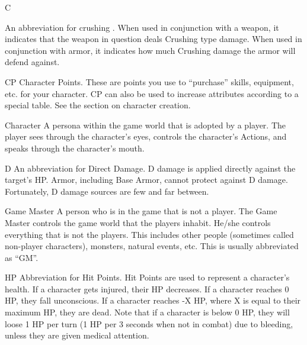 \documentclass[twoside]{book}
\begin{document}
              
              
              
                 C 
                
                An abbreviation for 
                  crushing  . When used in conjunction
                  with a weapon, it indicates that the weapon in question
                  deals Crushing type damage. When used in conjunction
                  with armor, it indicates how much Crushing damage the
                  armor will defend against.
                
              
              
               CP   
                  Character Points. These are points you use to
                 “purchase” skills, equipment, etc. for your
                 character. CP can also be used to increase attributes
                 according to a special table. See the section on
                 character creation. 
              
              
               Character   
                  A persona within the game world that is adopted
                 by a player. The player sees through the
                 character’s eyes, controls the character’s
                 Actions, and speaks through the character’s mouth.
                 
              
              
               D   
                  An abbreviation for Direct Damage. D damage is
                 applied directly against the target’s HP. Armor,
                 including Base Armor, cannot protect against D damage.
                 Fortunately, D damage sources are few and far between.
                 
              
              
               Game Master   
                  A person who is in the game that is not a player.
                 The Game Master controls the game world that the players
                 inhabit. He/she controls everything that is not the
                 players. This includes other people (sometimes called
                 non-player characters), monsters, natural events, etc.
                 This is usually abbreviated as “GM”. 
              
              
               HP   
                  Abbreviation for Hit Points. Hit Points are used
                 to represent a character’s health. If a character
                 gets injured, their HP decreases. If a character reaches
                 0 HP, they fall unconscious. If a character reaches -X
                 HP, where X is equal to their maximum HP, they are dead.
                 Note that if a character is below 0 HP, they will loose
                 1 HP per turn (1 HP per 3 seconds when not in combat)
                 due to bleeding, unless they are given medical
                 attention. 
              
\end{document}
